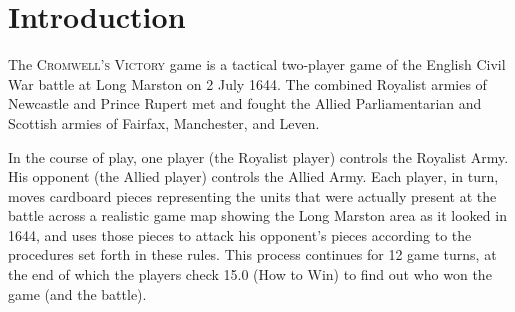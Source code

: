 \section{Introduction}

The \textsc{Cromwell's Victory} game is a tactical two-player game of the English Civil War battle at Long Marston on 2 July 1644. The combined Royalist armies of Newcastle and Prince Rupert met and fought the Allied Parliamentarian and Scottish armies of Fairfax, Manchester, and Leven.

In the course of play, one player (the Royalist player) controls the Royalist Army. His opponent (the Allied player) controls the Allied Army. Each player, in turn, moves cardboard pieces representing the units that were actually present at the battle across a realistic game map showing the Long Marston area as it looked in 1644, and uses those pieces to attack his opponent's pieces according to the procedures set forth in these rules. This process continues for 12 game turns, at the end of which the players check 15.0 (How to Win) to find out who won the game (and the battle).
